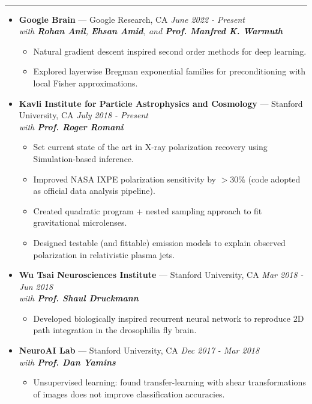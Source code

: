 \documentclass[11 pt,oneside]{article}
\newenvironment{ressection}[1]{
	\vspace{4pt}
	{\selectfont\Large\color{Mycolor2}{\textbf{#1}}}
	\vspace{-6.5pt} \\
	\textcolor{Mycolor2}{\rule{\textwidth}{0.7pt}}
	\begin{itemize}
	\vspace{3pt}
}{
	\end{itemize}
}
\newcommand{\ressubitem}{
	\vspace{-4pt}
	\item
}
\newcommand{\resbigitem}[3]{
	\vspace{-5pt}
	\item[]
	\textbf{#1} --- #2 %
	\hfill
	\textit{#3}
}
\newenvironment{ressubsec}[3]{
	\resbigitem{#1}{#2}{#3}
	\vspace{-2pt}
	\begin{itemize}
}{
	\end{itemize}
}
\begin{document}
\begin{ressection}{\textbf{Research}}

\vspace{2pt}
\begin{ressubsec}{Google Brain}{Google Research, CA}{June 2022 - Present \\ with \textbf{Rohan Anil}, \textbf{Ehsan Amid}, and \textbf{Prof. Manfred K. Warmuth}}
	\ressubitem{Natural gradient descent inspired second order methods for deep learning.}
	\ressubitem{Explored layerwise Bregman exponential families for preconditioning with local Fisher approximations.}
\end{ressubsec}

	\vspace{2pt}
	\begin{ressubsec}{Kavli Institute for Particle Astrophysics and Cosmology}{Stanford University, CA}{July 2018 - Present \\ with \textbf{Prof. Roger Romani}}
\ressubitem{Set current state of the art in X-ray polarization recovery using Simulation-based inference.}
\ressubitem{Improved NASA IXPE polarization sensitivity by $>30\%$ (code adopted as official data analysis pipeline).}
\ressubitem{Created quadratic program + nested sampling approach to fit gravitational microlenses.}
		\ressubitem{Designed testable (and fittable) emission models to explain observed polarization in relativistic plasma jets.}
	\end{ressubsec}

	\vspace{2pt}
	\begin{ressubsec}{Wu Tsai Neurosciences Institute}{Stanford University, CA}{Mar 2018 - Jun 2018 \\ with \textbf{Prof. Shaul Druckmann}}
\ressubitem{Developed biologically inspired recurrent neural network to reproduce 2D path integration in the drosophilia fly brain.}
	\end{ressubsec}

	\vspace{2pt}
	\begin{ressubsec}{NeuroAI Lab}{Stanford University, CA}{Dec 2017 - Mar 2018 \\ with \textbf{Prof. Dan Yamins}}
	\ressubitem{Unsupervised learning: found transfer-learning with shear transformations of images does not improve classification accuracies.}
	\end{ressubsec}


\end{ressection}
\end{document}
